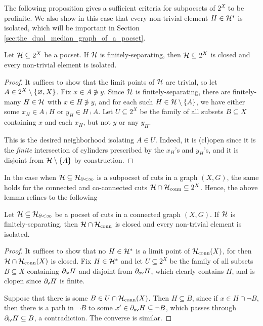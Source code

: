 \documentclass[reqno]{amsart}
\begin{document}
    The following proposition gives a sufficient criteria for subpocsets of $2^X$ to be profinite. We also show in this case that every non-trivial element $H\in\mathcal{H}^\ast$ is isolated, which will be important in Section \ref{sec:the_dual_median_graph_of_a_pocset}.

    \begin{lemma}\label{lem:finitely-separating_non-trivial_isolated}
        Let $\mathcal{H}\subseteq2^X$ be a pocset. If $\mathcal{H}$ is finitely-separating, then $\mathcal{H}\subseteq2^X$ is closed and every non-trivial element is isolated.
    \end{lemma}
    \begin{proof}
        It suffices to show that the limit points of $\mathcal{H}$ are trivial, so let $A\in2^X\setminus\left\{\varnothing,X\right\}$. Fix $x\in A\not\ni y$. Since $\mathcal{H}$ is finitely-separating, there are finitely-many $H\in\mathcal{H}$ with $x\in H\not\ni y$, and for each such $H\in\mathcal{H}\setminus\left\{A\right\}$, we have either some $x_H\in A\comp H$ or $y_H\in H\comp A$. Let $U\subseteq2^X$ be the family of all subsets $B\subseteq X$ containing $x$ and each $x_H$, but not $y$ or any $y_H$.

        This is the desired neighborhood isolating $A\in U$. Indeed, it is (cl)open since it is the \textit{finite} intersection of cylinders prescribed by the $x_H$'s and $y_H$'s, and it is disjoint from $\mathcal{H}\setminus\left\{A\right\}$ by construction.
    \end{proof}

    In the case when $\mathcal{H}\subseteq\mathcal{H}_{\partial<\infty}$ is a subpocset of cuts in a graph $(X,G)$, the same holds for the connected and co-connected cuts $\mathcal{H}\cap\mathcal{H}_\mathrm{conn}\subseteq2^X$. Hence, the above lemma refines to the following

    \begin{lemma}\label{lem:finitely-separating_non-trivial_isolated_connected}
        Let $\mathcal{H}\subseteq\mathcal{H}_{\partial<\infty}$ be a pocset of cuts in a connected graph $(X,G)$. If $\mathcal{H}$ is finitely-separating, then $\mathcal{H}\cap\mathcal{H}_\mathrm{conn}$ is closed and every non-trivial element is isolated.
    \end{lemma}
    \begin{proof}
        It suffices to show that no $H\in\mathcal{H}^\ast$ is a limit point of $\mathcal{H}_\mathrm{conn}(X)$, for then $\mathcal{H}\cap\mathcal{H}_\mathrm{conn}(X)$ is closed. Fix $H\in\mathcal{H}^\ast$ and let $U\subseteq2^X$ be the family of all subsets $B\subseteq X$ containing $\partial_\mathsf{iv}H$ and disjoint from $\partial_\mathsf{ov}H$, which clearly contains $H$, and is clopen since $\partial_\mathsf{v}H$ is finite.

        Suppose that there is some $B\in U\cap\mathcal{H}_\mathrm{conn}(X)$. Then $H\subseteq B$, since if $x\in H\cap\lnot B$, then there is a path in $\lnot B$ to some $x'\in\partial_\mathsf{ov}H\subseteq\lnot B$, which passes through $\partial_\mathsf{iv}H\subseteq B$, a contradiction. The converse is similar.
    \end{proof}
\end{document}
